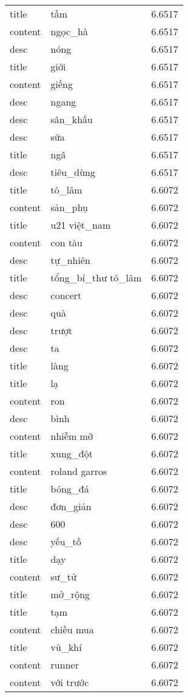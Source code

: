 \documentclass{article}
\begin{document}
\begin{tabular}{lll}
title & tầm & 6.6517\\
content & ngọc\_hà & 6.6517\\
desc & nóng & 6.6517\\
title & giới & 6.6517\\
content & giếng & 6.6517\\
desc & ngang & 6.6517\\
desc & sân\_khấu & 6.6517\\
desc & sữa & 6.6517\\
title & ngã & 6.6517\\
desc & tiêu\_dùng & 6.6517\\
title & tô\_lâm & 6.6072\\
content & sản\_phụ & 6.6072\\
title & u21 việt\_nam & 6.6072\\
content & con tàu & 6.6072\\
desc & tự\_nhiên & 6.6072\\
title & tổng\_bí\_thư tô\_lâm & 6.6072\\
desc & concert & 6.6072\\
desc & quà & 6.6072\\
desc & trượt & 6.6072\\
desc & ta & 6.6072\\
title & làng & 6.6072\\
title & lạ & 6.6072\\
content & ron & 6.6072\\
desc & bình & 6.6072\\
content & nhiễm mỡ & 6.6072\\
title & xung\_đột & 6.6072\\
content & roland garros & 6.6072\\
title & bóng\_đá & 6.6072\\
desc & đơn\_giản & 6.6072\\
desc & 600 & 6.6072\\
desc & yếu\_tố & 6.6072\\
title & dạy & 6.6072\\
content & sư\_tử & 6.6072\\
title & mở\_rộng & 6.6072\\
title & tạm & 6.6072\\
content & chiều mua & 6.6072\\
title & vũ\_khí & 6.6072\\
content & runner & 6.6072\\
content & với trước & 6.6072\\

\end{tabular}
\end{document}

